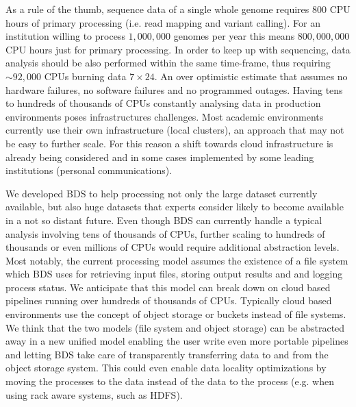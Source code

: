 As a rule of the thumb, sequence data of a single whole genome requires $800$ CPU hours of primary processing (i.e. read mapping and variant calling).
For an institution willing to process $1,000,000$ genomes per year this means $800,000,000$ CPU hours just for primary processing.
In order to keep up with sequencing, data analysis should be also performed within the same time-frame, thus requiring $\sim 92,000$ CPUs burning data $7 \times 24$.
An over optimistic estimate that assumes no hardware failures, no software failures and no programmed outages.
Having tens to hundreds of thousands of CPUs constantly analysing data in production environments poses infrastructures challenges.
Most academic environments currently use their own infrastructure (local clusters), an approach that may not be easy to further scale.
For this reason a shift towards cloud infrastructure is already being considered and in some cases implemented by some leading institutions (personal communications).

We developed BDS to help processing not only the large dataset currently available, but also huge datasets that experts consider likely to become available in a not so distant future.
Even though BDS can currently handle a typical analysis involving tens of thousands of CPUs, further scaling to hundreds of thousands or even millions of CPUs would require additional abstraction levels.
Most notably, the current processing model assumes the existence of a file system which BDS uses for retrieving input files, storing output results and and logging process status.
We anticipate that this model can break down on cloud based pipelines running over hundreds of thousands of CPUs.
Typically cloud based environments use the concept of object storage or buckets instead of file systems.
We think that the two models (file system and object storage) can be abstracted away in a new unified model enabling the user write even more portable pipelines and letting BDS take care of transparently transferring data to and from the object storage system.
This could even enable data locality optimizations by moving the processes to the data instead of the data to the process (e.g. when using rack aware systems, such as HDFS).

